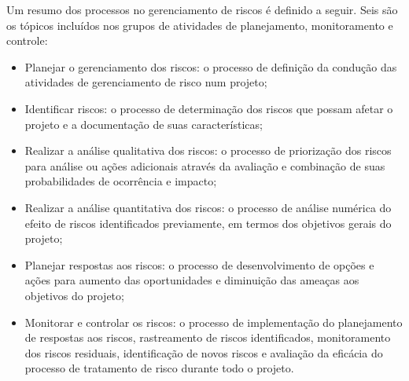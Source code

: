 Um resumo dos processos no gerenciamento de riscos é definido a seguir. Seis são os tópicos incluídos nos grupos de atividades de planejamento, monitoramento e controle:
\begin{itemize}
\item Planejar o gerenciamento dos riscos: o processo de definição da condução das atividades de gerenciamento de risco num projeto;
\item Identificar riscos: o processo de determinação dos riscos que possam afetar o projeto e a documentação de suas características;
\item Realizar a análise qualitativa dos riscos: o processo de priorização dos riscos para análise ou ações adicionais através da avaliação e combinação de suas probabilidades de ocorrência e impacto;
\item Realizar a análise quantitativa dos riscos: o processo de análise numérica do efeito de riscos identificados previamente, em termos dos objetivos gerais do projeto;
\item Planejar respostas aos riscos: o processo de desenvolvimento de opções e ações para aumento das oportunidades e diminuição das ameaças aos objetivos do projeto;
\item Monitorar e controlar os riscos: o processo de implementação do planejamento de respostas aos riscos, rastreamento de riscos identificados, monitoramento dos riscos residuais, identificação de novos riscos e avaliação da eficácia do processo de tratamento de risco durante todo o projeto.
\end{itemize}

